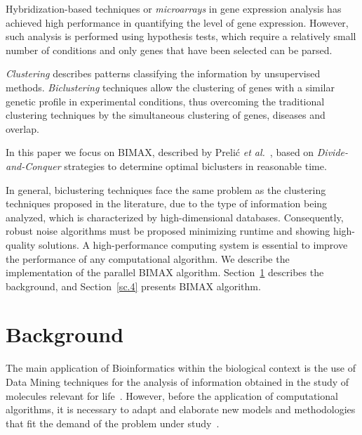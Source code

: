 \documentclass[a4paper,conference]{IEEEtran}
\begin{document}
Hybridization-based techniques or \textit{microarrays} in gene expression analysis has achieved high performance in quantifying the level of gene expression.  However, such analysis is performed using hypothesis tests, which require a relatively small number of conditions and only genes that have been selected can be parsed.

\textit{Clustering} describes patterns classifying the information by unsupervised methods. \textit{Biclustering} techniques allow the clustering of genes with a similar genetic profile in experimental conditions, thus overcoming the traditional clustering techniques by the simultaneous clustering of genes, diseases and overlap.

In this paper we focus on BIMAX, described by Preli\'c \textit{et al.}~\cite{prelic2006systematic}, based on \textit{Divide-and-Conquer} strategies to determine optimal biclusters in reasonable time.

In general, biclustering techniques face the same problem as the clustering techniques proposed in the literature, due to the type of information being analyzed, which is characterized by high-dimensional databases. Consequently, robust noise algorithms must be proposed minimizing runtime and showing high-quality solutions. A high-performance computing system is essential to improve the performance of any computational algorithm. We describe the implementation of the parallel BIMAX algorithm. Section~\ref{sc.2} describes the background, and Section~\ref{sc.4} presents BIMAX algorithm.

\section{Background} \label{sc.2}

The main application of Bioinformatics within the biological context is the use of Data Mining techniques for the analysis of information obtained in the study of molecules relevant for life~\cite{perezleo2003impacto}. However, before the application of computational algorithms, it is necessary to adapt and elaborate new models and methodologies that fit the demand of the problem under study~\cite{pontes2007evaluacion,  rossi2006handbook}.
\end{document}
